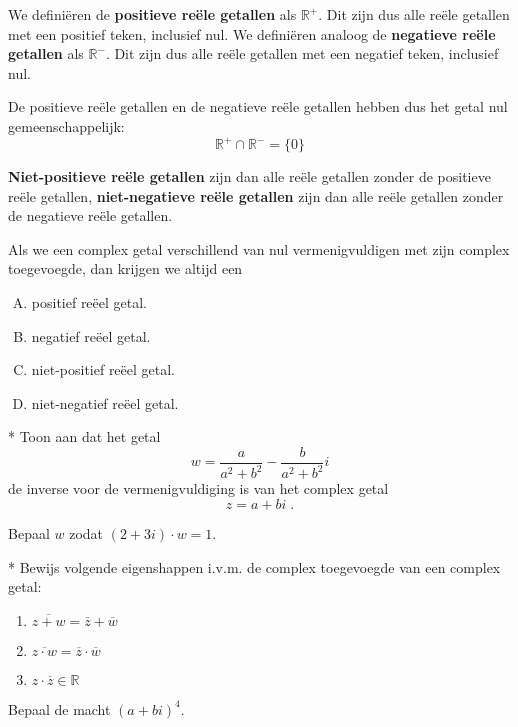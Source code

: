 \documentclass[12pt,twoside,a4paper]{article}
\begin{document}
\begin{oefening}
  We definiëren de {\bf positieve reële getallen} als $\mathbb{R}^+$. Dit zijn dus alle reële getallen met een positief teken, inclusief nul. We definiëren analoog de {\bf negatieve reële getallen} als $\mathbb{R}^-$. Dit zijn dus alle reële getallen met een negatief teken, inclusief nul.

  De positieve reële getallen en de negatieve reële getallen hebben dus het getal nul gemeenschappelijk:
  $$\mathbb{R}^+\cap\mathbb{R}^-=\{0\}$$

  {\bf Niet-positieve reële getallen} zijn dan alle reële getallen zonder de positieve reële getallen, {\bf niet-negatieve reële getallen} zijn dan alle reële getallen zonder de negatieve reële getallen.

  Als we een complex getal verschillend van nul vermenigvuldigen met zijn complex toegevoegde, dan krijgen we altijd een
  \begin{enumerate}[(A)]
  \item positief reëel getal.
  \item negatief reëel getal.
  \item niet-positief reëel getal.
  \item niet-negatief reëel getal.
  \end{enumerate}
\end{oefening}

\begin{oefening}*
Toon aan dat het getal
$$w=\dfrac{a}{a^2+b^2}-\dfrac{b}{a^2+b^2}i$$
de inverse voor de vermenigvuldiging is van het complex getal
$$z=a+bi\;.$$
\end{oefening}

\begin{oefening}
Bepaal $w$ zodat $(2+3i)\cdot w = 1$.
\end{oefening}

\begin{oefening}*
Bewijs volgende eigenshappen i.v.m. de complex toegevoegde van een complex getal:
\begin{enumerate}[a]
  \item $\overline{z+w}=\overline{z}+\overline{w}$
  \item $\overline{z\cdot w}=\overline{z}\cdot\overline{w}$
  \item $z\cdot\overline{z}\in\mathbb{R}$
\end{enumerate}
\end{oefening}

\begin{oefening}
Bepaal de macht $(a+bi)^4$.
\end{oefening}
\end{document}
